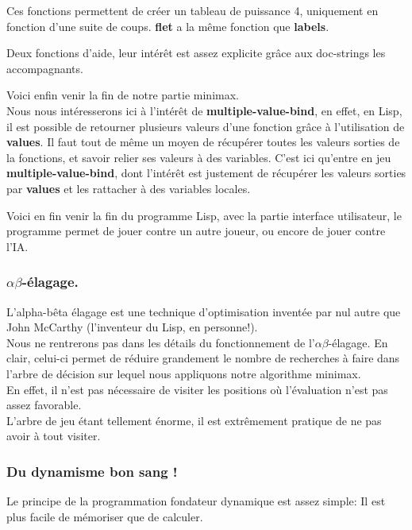 \documentclass[a4paper, 12pt]{article}
\newcommand{\connect}[1]{
  
}
\numberwithin{equation}{subsection}
\begin{document}
\connect{259-275}
Ces fonctions permettent de créer un tableau de puissance 4, uniquement en fonction d'une suite de coups. {\bf flet} a la même fonction que {\bf labels}.

\connect{277-283}
Deux fonctions d'aide, leur intérêt est assez explicite grâce aux doc-strings les accompagnants.

\connect{291-327}
Voici enfin venir la fin de notre partie minimax. \\

Nous nous intéresserons ici à l'intérêt de {\bf multiple-value-bind}, en effet, en Lisp, il est possible de retourner plusieurs valeurs d'une fonction grâce à l'utilisation de {\bf values}. Il faut tout de même un moyen de récupérer toutes les valeurs sorties de la fonctions, et savoir relier ses valeurs à des variables. C'est ici qu'entre en jeu {\bf multiple-value-bind}, dont l'intérêt est justement de récupérer les valeurs sorties par {\bf values} et les rattacher à des variables locales.

\connect{329-363}
Voici en fin venir la fin du programme Lisp, avec la partie interface utilisateur, le programme permet de jouer contre un autre joueur, ou encore de jouer contre l'IA. \\
\subsubsection{$\alpha\beta$-élagage.}
L'alpha-bêta élagage est une technique d'optimisation inventée par nul autre que John McCarthy (l'inventeur du Lisp, en personne!).\\

Nous ne rentrerons pas dans les détails du fonctionnement de l'$\alpha\beta$-élagage. En clair, celui-ci permet de réduire grandement le nombre de recherches à faire dans l'arbre de décision sur lequel nous appliquons notre algorithme minimax.\\

En effet, il n'est pas nécessaire de visiter les positions où l'évaluation n'est pas assez favorable.\\

L'arbre de jeu étant tellement énorme, il est extrêmement pratique de ne pas avoir à tout visiter.
\subsubsection{Du dynamisme bon sang !}
Le principe de la programmation fondateur dynamique est assez simple: Il est plus facile de mémoriser que de calculer.\\
\end{document}
